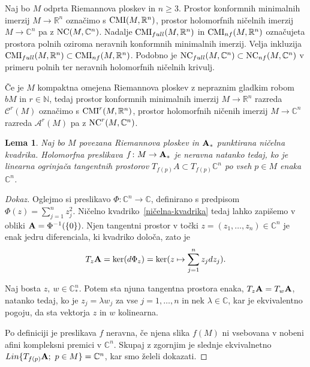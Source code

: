 \documentclass[12pt,a4paper,twoside]{article}
\theoremstyle{definition} %
\newenvironment{dokaz}[1][Dokaz]{\begin{proof}[#1]}{\end{proof}}
\theoremstyle{plain} %
\newtheorem{lema}[definicija]{Lema}
\numberwithin{equation}{section}  %
\newcommand{\R}{\mathbb R}
\newcommand{\N}{\mathbb N}
\newcommand{\C}{\mathbb C}
\begin{document}
Naj bo $M$ odprta Riemannova ploskev in $n \geq 3$. Prostor konformnih minimalnih imerzij $M \to \R^{n}$ označimo s $\textup{CMI}(M, \R^{n})$, prostor holomorfnih ničelnih imerzij $M \to \C^{n}$ pa z $\textup{NC}(M, \C^{n})$.
Nadalje $\textup{CMI}_{full}(M, \R^{n})$ in $\textup{CMI}_{nf}(M, \R^{n})$ označujeta prostora polnih oziroma neravnih konformnih minimalnih imerzij. Velja inkluzija $\textup{CMI}_{full}(M, \R^{n}) \subset \textup{CMI}_{nf}(M, \R^{n})$.
Podobno je $\textup{NC}_{full}(M, \C^{n}) \subset \textup{NC}_{nf}(M, \C^{n})$ v primeru polnih ter neravnih holomorfnih ničelnih krivulj.

Če je $M$ kompaktna omejena Riemannova ploskev z nepraznim gladkim robom $bM$ in $r \in \N$, tedaj prostor konformnih minimalnih imerzij $M \to \R^{n}$ razreda $\mathcal{C}^{r}(M)$ označimo s $\textup{CMI}^{r}(M, \R^{n})$, prostor holomorfnih ničenih imerzij $M \to \C^{n}$ razreda $\mathcal{A}^{r}(M)$ pa z $\textup{NC}^{r}(M, \C^{n})$.

\begin{lema} \label{lema:neravna f}
Naj bo $M$ povezana Riemannova ploskev in $\textbf{\textup{A}}_{*}$ punktirana ničelna kvadrika.
Holomorfna preslikava $f \colon M \to \textbf{\textup{A}}_{*}$ je neravna natanko tedaj, ko je linearna ogrinjača tangentnih prostorov 
$T_{f(p)} A \subset T_{f(p)} \C^{n}$ po vseh $p \in M$ enaka $\C^{n}$.
\end{lema}

\begin{dokaz}
Oglejmo si preslikavo 
$\Phi \colon \C^{n} \to \C$, definirano s predpisom $\Phi(z) = \sum_{j=1}^{n} z_{j}^{2}$.
Ničelno kvadriko~\ref{ničelna-kvadrika} tedaj lahko zapišemo v obliki $\textbf{\textup{A}} = \Phi^{-1}( \{0 \} )$.
Njen tangentni prostor v točki $z = (z_{1}, \dots , z_{n}) \in \C^{n}$ je enak jedru diferenciala, ki kvadriko določa, zato je
\[ T_{z} \textbf{\textup{A}} = \ker (d \Phi_{z}) = \ker (z \mapsto \sum_{j=1}^{n} z_{j} dz_{j}). \]

Naj bosta $z, \ w \in \C_{*}^{n}$. Potem sta njuna tangentna prostora enaka, $ T_{z} \textbf{\textup{A}} = T_{w} \textbf{\textup{A}} $, natanko tedaj, ko je $z_{j} = \lambda w_{j}$ za vse $j = 1, \dots , n$ in nek $\lambda \in \C$, kar je ekvivalentno pogoju, da sta vektorja $z$ in $w$ kolinearna.

Po definiciji je preslikava $f$ neravna, če njena slika $f(M)$ ni vsebovana v nobeni afini kompleksni premici v $\C^{n}$. Skupaj z zgornjim je slednje ekvivalnetno 
$ Lin \{T_{f(p)} \textbf{\textup{A}} ; \ p \in M \} = \C^{n}$, kar smo želeli dokazati.
\end{dokaz}
\end{document}
